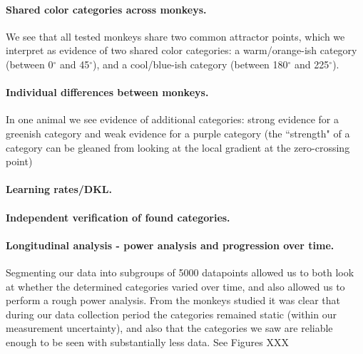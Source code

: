 \paragraph{Shared color categories across monkeys.}

We see that all tested monkeys share two common attractor points, which we interpret as evidence of two shared color categories: a warm/orange-ish category (between 0$^\circ$ and 45$^\circ$), and a cool/blue-ish category (between 180$^\circ$ and 225$^\circ$).

\paragraph{Individual differences between monkeys.}

In one animal we see evidence of additional categories: strong evidence for a greenish category and weak evidence for a purple category (the ``strength" of a category can be gleaned from looking at the local gradient at the zero-crossing point)



\paragraph{Learning rates/DKL.}

\paragraph{Independent verification of found categories.}

\paragraph{Longitudinal analysis - power analysis and progression over time.}

Segmenting our data into subgroups of 5000 datapoints allowed us to both look at whether the determined categories varied over time, and also allowed us to perform a rough power analysis. From the monkeys studied it was clear that during our data collection period the categories remained static (within our measurement uncertainty), and also that the categories we saw are reliable enough to be seen with substantially less data. See Figures XXX %





